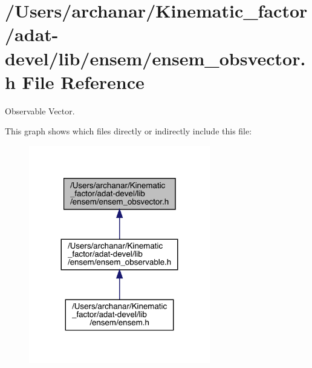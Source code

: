 \hypertarget{adat-devel_2lib_2ensem_2ensem__obsvector_8h}{}\section{/\+Users/archanar/\+Kinematic\+\_\+factor/adat-\/devel/lib/ensem/ensem\+\_\+obsvector.h File Reference}
\label{adat-devel_2lib_2ensem_2ensem__obsvector_8h}


Observable Vector.  


This graph shows which files directly or indirectly include this file\+:
\nopagebreak
\begin{figure}[H]
\begin{center}
\leavevmode
\includegraphics[width=224pt]{d2/d02/adat-devel_2lib_2ensem_2ensem__obsvector_8h__dep__incl}
\end{center}
\end{figure}
